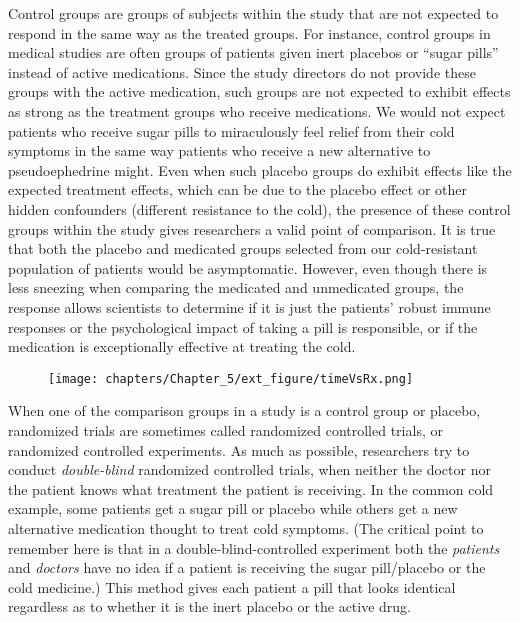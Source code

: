 \documentclass[11pt]{book}\usepackage[]{graphicx}\usepackage[]{color}
\begin{document}
Control groups are groups of subjects within the study that are not expected to respond in the same way as the treated groups.  For instance, control groups in medical studies are often groups of patients given inert placebos or ``sugar pills'' instead of active medications. Since the study directors do not provide these groups with the active medication, such groups are not expected to exhibit effects as strong as the treatment groups who receive medications.  We would not expect patients who receive sugar pills to miraculously feel relief from their cold symptoms in the same way patients who receive a new alternative to pseudoephedrine might. Even when such placebo groups do exhibit effects like the expected treatment effects, which can be due to the placebo effect or other hidden confounders (different resistance to the cold), the presence of these control groups within the study gives researchers a valid point of comparison. It is true that both the placebo and medicated groups selected from our cold-resistant population of patients would be asymptomatic. However, even though there is less sneezing when comparing the medicated and unmedicated groups, the response allows scientists to determine if it is just the patients' robust immune responses or the psychological impact of taking a pill is responsible, or if the medication is exceptionally effective at treating the cold.


\begin{figure}[ht]
   \centering
   \texttt{[image: chapters/Chapter\_5/ext\_figure/timeVsRx.png]} %
\end{figure}

When one of the comparison groups in a study is a control group or placebo, randomized trials are sometimes called randomized controlled trials, or randomized controlled experiments. As much as possible, researchers try to conduct \textit{double-blind} randomized controlled trials, when neither the doctor nor the patient knows what treatment the patient is receiving.  In the common cold example, some patients get a sugar pill or placebo while others get a new alternative medication thought to treat cold symptoms.  (The critical point to remember here is that in a double-blind-controlled experiment both the \textit{patients} and \textit{doctors} have no idea if a patient is receiving the sugar pill/placebo or the cold medicine.) This method gives each patient a pill that looks identical regardless as to whether it is the inert placebo or the active drug.
\end{document}
